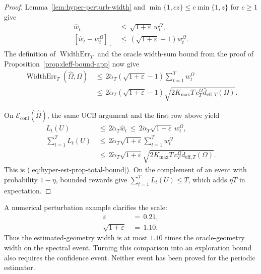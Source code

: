\documentclass{article} %
\renewcommand{\eqref}[1]{\textup{(\ref{#1})}}
\begin{document}
\begin{proof}
Lemma~\ref{lem:hyper-perturb-width} and
\(\min\{1,cz\}\leq c\min\{1,z\}\) for \(c\geq1\) give
\begin{equation}
\label{eq:hyper-est-proof-width}
\begin{aligned}
\widehat w_t
&\,\leq\,
\sqrt{1+\varepsilon}\,w_t^\Omega,
\\
\left[\widehat w_t-w_t^\Omega\right]_+
&\,\leq\,
\left(\sqrt{1+\varepsilon}-1\right)
w_t^\Omega.
\end{aligned}
\end{equation}
The definition of \(\operatorname{WidthErr}_T\) and the oracle width-sum bound
from the proof of Proposition~\ref{prop:deff-bound-app} now give
\begin{equation}
\label{eq:hyper-est-proof-err}
\begin{aligned}
\operatorname{WidthErr}_T(\widehat{\Omega},\Omega)
&\,\leq\,
2\widetilde\alpha_T
\left(\sqrt{1+\varepsilon}-1\right)
\sum_{t=1}^{T}w_t^\Omega
\\
&\,\leq\,
2\widetilde\alpha_T
\left(\sqrt{1+\varepsilon}-1\right)
\sqrt{
2K_{\max}T\,c_T^\Omega
\bar d_{\mathrm{eff},T}(\Omega)
}.
\end{aligned}
\end{equation}

On \(\mathcal E_{\mathrm{conf}}(\widehat\Omega)\), the same UCB argument and
the first row above yield
\begin{equation*}
\begin{aligned}
L_t(U)
&\,\leq\,
2\widetilde\alpha_T
\widehat w_t
\,\leq\,
2\widetilde\alpha_T\sqrt{1+\varepsilon}\,w_t^\Omega,
\\
\sum_{t=1}^{T}L_t(U)
&\,\leq\,
2\widetilde\alpha_T\sqrt{1+\varepsilon}
\sum_{t=1}^{T}w_t^\Omega
\\
&\,\leq\,
2\widetilde\alpha_T\sqrt{1+\varepsilon}
\sqrt{
2K_{\max}T\,c_T^\Omega
\bar d_{\mathrm{eff},T}(\Omega)
}.
\end{aligned}
\end{equation*}
This is \eqref{eq:hyper-est-prop-total-bound}. On the complement of an event
with probability \(1-\eta\), bounded rewards give
\(\sum_{t=1}^T L_t(U)\leq T\), which adds \(\eta T\) in expectation.
\end{proof}

A numerical perturbation example clarifies the scale:
\begin{align}
\varepsilon
&\,=\,
0.21,
\label{eq:hyper-est-example-eps}
\\
\sqrt{1+\varepsilon}
&\,=\,
1.10.
\label{eq:hyper-est-example-sqrt}
\end{align}
Thus the estimated-geometry width is at most \(1.10\) times the
oracle-geometry width on the spectral event. Turning this comparison into an
exploration bound also requires the confidence event. Neither event has been
proved for the periodic estimator.
\end{document}
